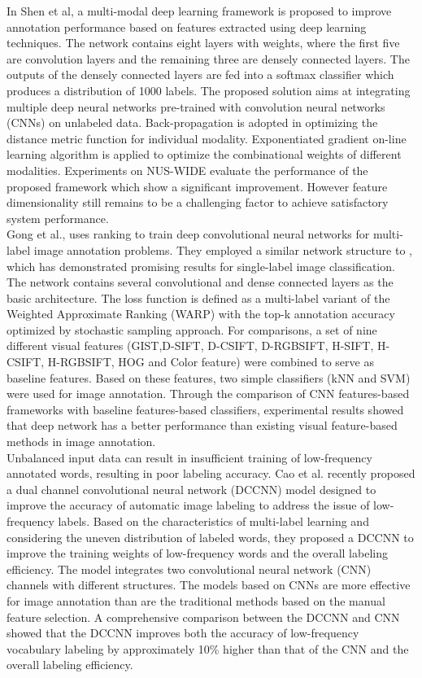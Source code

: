\documentclass[conference]{IEEEtran}
\begin{document}
		In Shen et al\cite{Zhu}, a multi-modal deep learning framework is proposed to improve annotation performance based on features extracted using deep learning techniques. The network contains eight layers with weights, where the first five are convolution layers and the
remaining three are densely connected layers. The outputs of the densely connected layers are fed into a softmax classifier which produces a distribution of 1000 labels. The proposed
		solution aims at integrating multiple deep neural networks pre-trained with convolution
 neural networks (CNNs) on unlabeled data. Back-propagation is adopted in optimizing the distance metric function for individual modality. Exponentiated gradient on-line learning
algorithm\cite{kivinen} is applied to optimize the combinational weights of different modalities.
Experiments on NUS-WIDE evaluate the performance of the proposed framework which
show a significant improvement. However feature dimensionality still remains to be a
challenging factor to achieve satisfactory system performance.\\
		
		Gong et al.\cite{Gong}, uses ranking to train deep convolutional neural networks for multi-label image annotation problems. They employed a similar network structure to \cite{Hinton},
which has demonstrated promising results for single-label image classification. The network
contains several convolutional and dense connected layers as the basic architecture. The
loss function is defined as a multi-label variant of the Weighted Approximate Ranking
(WARP) with the top-k annotation accuracy optimized by stochastic sampling approach.
For comparisons, a set of nine different visual features (GIST,D-SIFT, D-CSIFT,
D-RGBSIFT, H-SIFT, H-CSIFT, H-RGBSIFT, HOG and Color feature) were
		combined to serve as baseline features. Based on these features, two simple classifiers (kNN
and SVM) were used for image annotation. Through the comparison of CNN features-based
frameworks with baseline features-based classifiers, experimental results showed that deep
network has a better performance than existing visual feature-based methods in image
annotation.\\
		
		Unbalanced input data can result in insufficient training of low-frequency annotated
words, resulting in poor labeling accuracy. Cao et al.\cite{Cao} recently proposed a dual channel convolutional neural network (DCCNN) model designed to improve the accuracy
of automatic image labeling to address the issue of low-frequency labels. Based on the
characteristics of multi-label learning and considering the uneven distribution of labeled
words, they proposed a DCCNN to improve the training weights of low-frequency words
and the overall labeling efficiency. The model integrates two convolutional neural network
(CNN) channels with different structures. The models based on CNNs are more effective for
image annotation than are the traditional methods based on the manual feature selection.
A comprehensive comparison between the DCCNN and CNN showed that the DCCNN
improves both the accuracy of low-frequency vocabulary labeling by approximately 10\%
higher than that of the CNN and the overall labeling efficiency.\\
		
\end{document}

